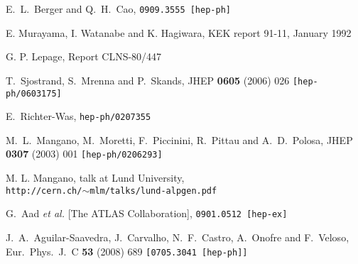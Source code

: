 \documentclass[12pt,a4paper]{article}
\begin{document}
\begin{thebibliography}{99}
  E.~L.~Berger and Q.~H.~Cao,
  {\tt 0909.3555 [hep-ph]}

E. Murayama, I. Watanabe and K. Hagiwara,
KEK report 91-11, January 1992

G. P. Lepage,
Report CLNS-80/447

  T.~Sjostrand, S.~Mrenna and P.~Skands,
  JHEP {\bf 0605} (2006) 026
  {\tt [hep-ph/0603175]}

  E.~Richter-Was,
  {\tt hep-ph/0207355}

  M.~L.~Mangano, M.~Moretti, F.~Piccinini, R.~Pittau and A.~D.~Polosa,
  JHEP {\bf 0307} (2003) 001
  {\tt [hep-ph/0206293]}

  M. L. Mangano, talk at Lund University,\\
  {\tt http://cern.ch/$\sim$mlm/talks/lund-alpgen.pdf}


  G.~Aad {\it et al.}  [The ATLAS Collaboration],
  {\tt 0901.0512 [hep-ex]}

  J.~A.~Aguilar-Saavedra, J.~Carvalho, N.~F.~Castro, A.~Onofre and F.~Veloso,
  Eur.\ Phys.\ J.\  C {\bf 53} (2008) 689
  {\tt [0705.3041 [hep-ph]]}



\end{thebibliography}
\end{document}
